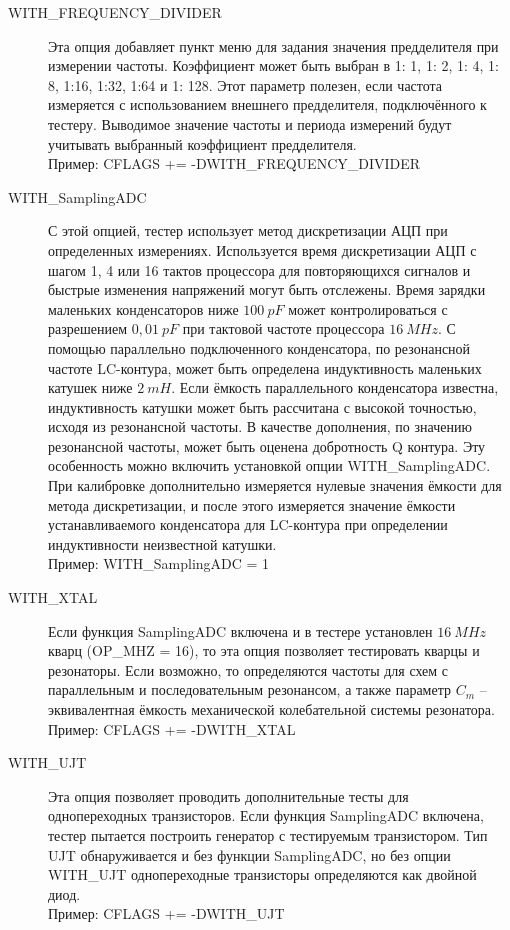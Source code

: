 \begin{description}
  \item[WITH\_FREQUENCY\_DIVIDER]
Эта опция добавляет пункт меню для задания значения предделителя при измерении частоты.
Коэффициент может быть выбран в 1: 1, 1: 2, 1: 4, 1: 8, 1:16, 1:32, 1:64 и 1: 128.
Этот параметр полезен, если частота измеряется с использованием внешнего предделителя, подключённого к тестеру.
Выводимое значение частоты и периода измерений будут учитывать выбранный коэффициент предделителя.\\
Пример: CFLAGS += -DWITH\_FREQUENCY\_DIVIDER

  \item[WITH\_SamplingADC] С этой опцией, тестер использует метод дискретизации АЦП при определенных измерениях.
Используется время дискретизации АЦП с шагом 1, 4 или 16 тактов процессора для повторяющихся сигналов и
быстрые изменения напряжений могут быть отслежены.
Время зарядки маленьких конденсаторов ниже \(100~pF\) может контролироваться с разрешением \(0,01~pF\) при 
тактовой частоте процессора \(16~MHz\).
С помощью параллельно подключенного конденсатора, по резонансной частоте LC-контура, может быть
определена индуктивность маленьких катушек ниже \(2~mH\).
Если ёмкость параллельного конденсатора известна, индуктивность катушки может быть рассчитана с высокой
точностью, исходя из резонансной частоты. В качестве дополнения, по значению резонансной частоты, может
быть оценена добротность Q контура.
Эту особенность можно включить установкой опции WITH\_SamplingADC.
При калибровке дополнительно измеряется нулевые значения ёмкости для метода дискретизации, и после этого измеряется
значение ёмкости устанавливаемого конденсатора для LC-контура при определении индуктивности неизвестной катушки.\\
Пример: WITH\_SamplingADC = 1

  \item[WITH\_XTAL] Если функция SamplingADC включена и в тестере установлен \(16~MHz\) кварц (OP\_MHZ = 16),
то эта опция позволяет тестировать кварцы и резонаторы.
Если возможно, то определяются частоты для схем с параллельным и последовательным резонансом,
а также параметр $C_{m}$ -- эквивалентная ёмкость механической колебательной системы резонатора.\\
Пример: CFLAGS += -DWITH\_XTAL

  \item[WITH\_UJT] Эта опция позволяет проводить дополнительные тесты для однопереходных транзисторов.
Если функция SamplingADC включена, тестер пытается построить генератор с тестируемым транзистором.
Тип UJT обнаруживается и без функции SamplingADC, но 
без опции WITH\_UJT однопереходные транзисторы определяются как двойной диод.\\
Пример: CFLAGS += -DWITH\_UJT


\end{description}
